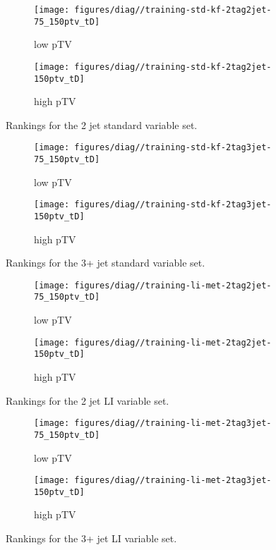 \begin{figure}[!htbp]\captionsetup{justification=centering}
  \centering
\begin{subfigure}[t]{0.49\textwidth}\centering\texttt{[image: figures/diag//training-std-kf-2tag2jet-75\_150ptv\_tD]}\caption{low pTV}\end{subfigure}
\begin{subfigure}[t]{0.49\textwidth}\centering\texttt{[image: figures/diag//training-std-kf-2tag2jet-150ptv\_tD]}\caption{high pTV}\end{subfigure}
  \caption{Rankings for the 2 jet standard variable set.}
  \label{fig:std-kf-Ranking}
\end{figure}
\begin{figure}[!htbp]\captionsetup{justification=centering}
  \centering
\begin{subfigure}[t]{0.49\textwidth}\centering\texttt{[image: figures/diag//training-std-kf-2tag3jet-75\_150ptv\_tD]}\caption{low pTV}\end{subfigure}
\begin{subfigure}[t]{0.49\textwidth}\centering\texttt{[image: figures/diag//training-std-kf-2tag3jet-150ptv\_tD]}\caption{high pTV}\end{subfigure}
  \caption{Rankings for the 3+ jet standard variable set.}
  \label{fig:std-kf-Ranking3}
\end{figure}

\begin{figure}[!htbp]\captionsetup{justification=centering}
  \centering
\begin{subfigure}[t]{0.49\textwidth}\centering\texttt{[image: figures/diag//training-li-met-2tag2jet-75\_150ptv\_tD]}\caption{low pTV}\end{subfigure}
\begin{subfigure}[t]{0.49\textwidth}\centering\texttt{[image: figures/diag//training-li-met-2tag2jet-150ptv\_tD]}\caption{high pTV}\end{subfigure}
  \caption{Rankings for the 2 jet LI variable set.}
  \label{fig:li-met-Ranking}
\end{figure}
\begin{figure}[!htbp]\captionsetup{justification=centering}
  \centering
\begin{subfigure}[t]{0.49\textwidth}\centering\texttt{[image: figures/diag//training-li-met-2tag3jet-75\_150ptv\_tD]}\caption{low pTV}\end{subfigure}
\begin{subfigure}[t]{0.49\textwidth}\centering\texttt{[image: figures/diag//training-li-met-2tag3jet-150ptv\_tD]}\caption{high pTV}\end{subfigure}
  \caption{Rankings for the 3+ jet LI variable set.}
  \label{fig:li-met-Ranking3}
\end{figure}

